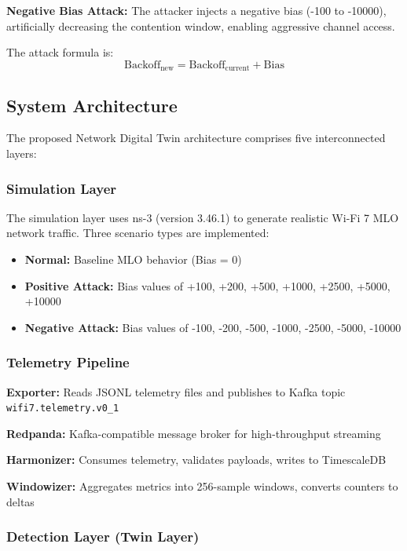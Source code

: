 \documentclass[12pt,a4paper]{article}
\begin{document}
\textbf{Negative Bias Attack:} The attacker injects a negative bias (-100 to -10000), artificially decreasing the contention window, enabling aggressive channel access.

The attack formula is:
\begin{equation}
    \text{Backoff}_{\text{new}} = \text{Backoff}_{\text{current}} + \text{Bias}
\end{equation}

\subsection{System Architecture}

The proposed Network Digital Twin architecture comprises five interconnected layers:

\subsubsection{Simulation Layer}

The simulation layer uses ns-3 (version 3.46.1) to generate realistic Wi-Fi 7 MLO network traffic. Three scenario types are implemented:

\begin{itemize}
    \item \textbf{Normal:} Baseline MLO behavior (Bias = 0)
    \item \textbf{Positive Attack:} Bias values of +100, +200, +500, +1000, +2500, +5000, +10000
    \item \textbf{Negative Attack:} Bias values of -100, -200, -500, -1000, -2500, -5000, -10000
\end{itemize}

\subsubsection{Telemetry Pipeline}

\textbf{Exporter:} Reads JSONL telemetry files and publishes to Kafka topic \texttt{wifi7.telemetry.v0\_1}

\textbf{Redpanda:} Kafka-compatible message broker for high-throughput streaming

\textbf{Harmonizer:} Consumes telemetry, validates payloads, writes to TimescaleDB

\textbf{Windowizer:} Aggregates metrics into 256-sample windows, converts counters to deltas

\subsubsection{Detection Layer (Twin Layer)}
\end{document}
